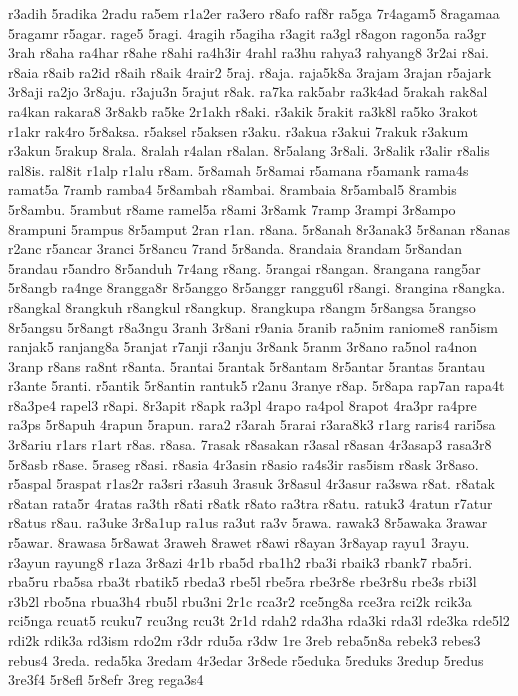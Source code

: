 {r3adih 5radika 2radu ra5em r1a2er ra3ero r8afo raf8r ra5ga 7r4agam5
8ragamaa 5ragamr r5agar. rage5 5ragi. 4ragih r5agiha r3agit ra3gl r8agon
ragon5a ra3gr 3rah r8aha ra4har r8ahe r8ahi ra4h3ir 4rahl ra3hu rahya3
rahyang8 3r2ai r8ai. r8aia r8aib ra2id r8aih r8aik 4rair2 5raj. r8aja.
raja5k8a 3rajam 3rajan r5ajark 3r8aji ra2jo 3r8aju. r3aju3n 5rajut r8ak.
ra7ka rak5abr ra3k4ad 5rakah rak8al ra4kan rakara8 3r8akb ra5ke 2r1akh
r8aki. r3akik 5rakit ra3k8l ra5ko 3rakot r1akr rak4ro 5r8aksa. r5aksel
r5aksen r3aku. r3akua r3akui 7rakuk r3akum r3akun 5rakup 8rala. 8ralah
r4alan r8alan. 8r5alang 3r8ali. 3r8alik r3alir r8alis ral8is. ral8it r1alp
r1alu r8am. 5r8amah 5r8amai r5amana r5amank rama4s ramat5a 7ramb ramba4
5r8ambah r8ambai. 8rambaia 8r5ambal5 8rambis 5r8ambu. 5rambut r8ame
ramel5a r8ami 3r8amk 7ramp 3rampi 3r8ampo 8rampuni 5rampus 8r5amput 2ran
r1an. r8ana. 5r8anah 8r3anak3 5r8anan r8anas r2anc r5ancar 3ranci 5r8ancu
7rand 5r8anda. 8randaia 8randam 5r8andan 5randau r5andro 8r5anduh 7r4ang
r8ang. 5rangai r8angan. 8rangana rang5ar 5r8angb ra4nge 8rangga8r 8r5anggo
8r5anggr ranggu6l r8angi. 8rangina r8angka. r8angkal 8rangkuh r8angkul
r8angkup. 8rangkupa r8angm 5r8angsa 5rangso 8r5angsu 5r8angt r8a3ngu 3ranh
3r8ani r9ania 5ranib ra5nim raniome8 ran5ism ranjak5 ranjang8a 5ranjat
r7anji r3anju 3r8ank 5ranm 3r8ano ra5nol ra4non 3ranp r8ans ra8nt r8anta.
5rantai 5rantak 5r8antam 8r5antar 5rantas 5rantau r3ante 5ranti. r5antik
5r8antin rantuk5 r2anu 3ranye r8ap. 5r8apa rap7an rapa4t r8a3pe4 rapel3
r8api. 8r3apit r8apk ra3pl 4rapo ra4pol 8rapot 4ra3pr ra4pre ra3ps 5r8apuh
4rapun 5rapun. rara2 r3arah 5rarai r3ara8k3 r1arg raris4 rari5sa 3r8ariu
r1ars r1art r8as. r8asa. 7rasak r8asakan r3asal r8asan 4r3asap3 rasa3r8
5r8asb r8ase. 5raseg r8asi. r8asia 4r3asin r8asio ra4s3ir ras5ism r8ask
3r8aso. r5aspal 5raspat r1as2r ra3sri r3asuh 3rasuk 3r8asul 4r3asur ra3swa
r8at. r8atak r8atan rata5r 4ratas ra3th r8ati r8atk r8ato ra3tra r8atu.
ratuk3 4ratun r7atur r8atus r8au. ra3uke 3r8a1up ra1us ra3ut ra3v 5rawa.
rawak3 8r5awaka 3rawar r5awar. 8rawasa 5r8awat 3raweh 8rawet r8awi r8ayan
3r8ayap rayu1 3rayu. r3ayun rayung8 r1aza 3r8azi 4r1b rba5d rba1h2 rba3i
rbaik3 rbank7 rba5ri. rba5ru rba5sa rba3t rbatik5 rbeda3 rbe5l rbe5ra
rbe3r8e rbe3r8u rbe3s rbi3l r3b2l rbo5na rbua3h4 rbu5l rbu3ni 2r1c rca3r2
rce5ng8a rce3ra rci2k rcik3a rci5nga rcuat5 rcuku7 rcu3ng rcu3t 2r1d rdah2
rda3ha rda3ki rda3l rde3ka rde5l2 rdi2k rdik3a rd3ism rdo2m r3dr rdu5a
r3dw 1re 3reb reba5n8a rebek3 rebes3 rebus4 3reda. reda5ka 3redam 4r3edar
3r8ede r5eduka 5reduks 3redup 5redus 3re3f4 5r8efl 5r8efr 3reg rega3s4
}
